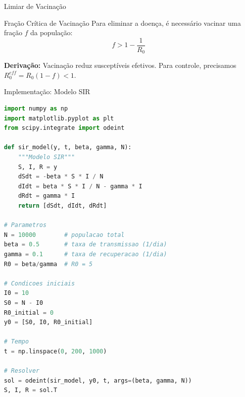 \begin{frame}{Limiar de Vacinação}
\begin{block}{Fração Crítica de Vacinação}
Para eliminar a doença, é necessário vacinar uma fração $f$ da população:
\begin{equation*}
f > 1 - \frac{1}{R_0}
\end{equation*}
\end{block}

\textbf{Derivação:} Vacinação reduz susceptíveis efetivos. Para controle, precisamos $R_0^{eff} = R_0(1-f) < 1$.

\begin{center}
\end{center}

\end{frame}

\begin{frame}[fragile]{Implementação: Modelo SIR}
\begin{lstlisting}[language=Python, caption=Simulação de epidemia SIR]
import numpy as np
import matplotlib.pyplot as plt
from scipy.integrate import odeint

def sir_model(y, t, beta, gamma, N):
    """Modelo SIR"""
    S, I, R = y
    dSdt = -beta * S * I / N
    dIdt = beta * S * I / N - gamma * I
    dRdt = gamma * I
    return [dSdt, dIdt, dRdt]

# Parametros
N = 10000        # populacao total
beta = 0.5       # taxa de transmissao (1/dia)
gamma = 0.1      # taxa de recuperacao (1/dia)
R0 = beta/gamma  # R0 = 5

# Condicoes iniciais
I0 = 10
S0 = N - I0
R0_initial = 0
y0 = [S0, I0, R0_initial]

# Tempo
t = np.linspace(0, 200, 1000)

# Resolver
sol = odeint(sir_model, y0, t, args=(beta, gamma, N))
S, I, R = sol.T
\end{lstlisting}
\end{frame}

